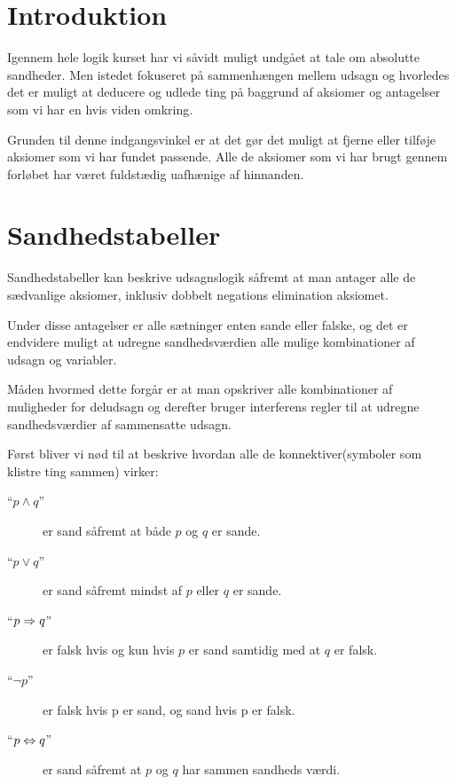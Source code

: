 \ifx\preampleIncluded\undefined
\def\startSamlet{}


\fi


\section{Introduktion}
Igennem hele logik kurset har vi såvidt muligt undgået at tale om absolutte sandheder.
Men istedet fokuseret på sammenhængen mellem udsagn og hvorledes det er
muligt at deducere og udlede ting på baggrund af aksiomer og antagelser som vi har en hvis viden omkring.

Grunden til denne indgangsvinkel er at det gør det muligt at fjerne eller tilføje aksiomer som vi har fundet passende.
Alle de aksiomer som vi har brugt gennem forløbet har været fuldstædig uafhænige af hinnanden.

\section{Sandhedstabeller}
Sandhedstabeller kan beskrive udsagnslogik såfremt at man antager alle de sædvanlige aksiomer,
inklusiv dobbelt negations elimination aksiomet.

Under disse antagelser er alle sætninger enten sande eller falske,
og det er endvidere muligt at udregne sandhedsværdien alle mulige kombinationer af udsagn og variabler.

Måden hvormed dette forgår er at man opskriver alle kombinationer af muligheder for deludsagn og
derefter bruger interferens regler til at udregne sandhedsværdier af sammensatte udsagn.

Først bliver vi nød til at beskrive hvordan alle de konnektiver(symboler som klistre ting sammen) virker:
\begin{description}
    \item[``$p \land q$''] er sand såfremt at både $p$ og $q$ er sande.
    \item[``$p \lor q$''] er sand såfremt mindst af $p$ eller $q$ er sande.
    \item[``$p \Rightarrow q$''] er falsk hvis og kun hvis $p$ er sand samtidig med at $q$ er falsk.
    \item[``$ \lnot p$''] er falsk hvis p er sand, og sand hvis p er falsk.
    \item[``$p \Leftrightarrow q$''] er sand såfremt at $p$ og $q$ har sammen sandheds værdi.
\end{description}

